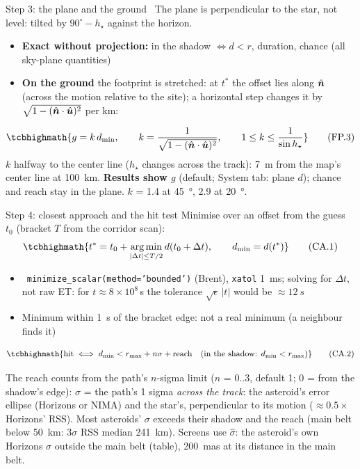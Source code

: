 \begin{frame}{Step 3: the plane and the ground}
  \OWN\ The plane is perpendicular to the star, \alert{not level}: tilted by $90^\circ - h_\star$ against the horizon.
  \begin{itemize}\setlength{\itemsep}{0.5ex}
    \item \textbf{Exact without projection:} in the shadow $\iff d < r$, duration, chance (all sky-plane quantities)
    \item \textbf{On the ground} the footprint is stretched: at $t^{*}$ the offset lies along $\hat{\bm{n}}$ (across the motion
          relative to the site); a horizontal step changes it by $\sqrt{1 - (\hat{\bm{n}}\cdot\hat{\bm{u}})^2}$ per km:
  \end{itemize}
  \[
    \tcbhighmath{g = k\,d_{\min},\qquad k = \frac{1}{\sqrt{1 - (\uv{n}\cdot\uv{u})^2}},\qquad 1 \le k \le \frac{1}{\sin h_\star}}
    \tag{FP.3}
  \]
  {\small $k$ halfway to the center line ($h_\star$ changes across the track): \SI{7}{m} from the map's center line at
  \SI{100}{km}. \textbf{Results show $g$} (default; System tab: plane $d$); chance and reach stay in the plane.
  $k$ = 1.4 at \SI{45}{\degree}, 2.9 at \SI{20}{\degree}.}
\end{frame}

\begin{frame}{Step 4: closest approach and the hit test}
  Minimise over an offset from the guess $t_0$ (bracket $T$ from the corridor scan):
  \[
    \tcbhighmath{t^{*} = t_0 + \operatorname*{arg\,min}_{|\Delta t| \le T/2} d(t_0 + \Delta t),
    \qquad d_{\min} = d(t^{*})}
    \tag{CA.1}
  \]
  \begin{itemize}
    \item \SC\ \texttt{minimize\_scalar(method='bounded')} (Brent), \texttt{xatol} \SI{1}{ms}; solving for $\Delta t$, not raw ET:
          for $t \approx 8\times10^{8}$\,s the tolerance $\sqrt{\epsilon}\,|t|$ would be $\approx\SI{12}{s}$
    \item Minimum within \SI{1}{s} of the bracket edge: not a real minimum (a neighbour finds it)
  \end{itemize}
  \[
    \tcbhighmath{\text{hit} \iff d_{\min} < r_{\max} + n\sigma + \text{reach}
    \quad(\text{in the shadow: } d_{\min} < r_{\max})}
    \tag{CA.2}
  \]
  {\scriptsize The reach counts from the path's $n$-sigma limit ($n$ = 0..3, default 1; 0 = from the shadow's edge):
  $\sigma$ = the path's 1 sigma \emph{across the track}: the asteroid's error ellipse (Horizons or NIMA) and the star's,
  perpendicular to its motion ($\approx 0.5\times$ Horizons' RSS). Most asteroids' $\sigma$ exceeds their shadow and the
  reach (main belt below \SI{50}{km}: 3$\sigma$ RSS median \SI{241}{km}). Screens use $\hat\sigma$: the asteroid's own
  Horizons $\sigma$ outside the main belt (table), \SI{200}{mas} at its distance in the main belt.\par}
\end{frame}

